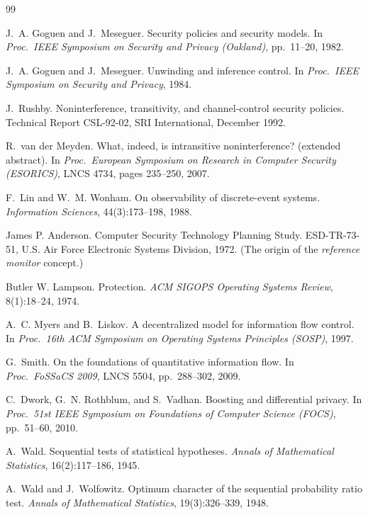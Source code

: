 \documentclass[11pt,a4paper]{article}
\theoremstyle{definition}
\begin{document}
\begin{thebibliography}{99}

 J.~A. Goguen and J.~Meseguer. Security policies and security models. In
\emph{Proc.\ IEEE Symposium on Security and Privacy (Oakland)}, pp.~11--20, 1982.

 J.~A. Goguen and J.~Meseguer. Unwinding and inference control. In
\emph{Proc.\ IEEE Symposium on Security and Privacy}, 1984.

 J.~Rushby. Noninterference, transitivity, and channel-control security policies.
Technical Report CSL-92-02, SRI International, December 1992.

 R.~van der Meyden. What, indeed, is intransitive noninterference? (extended abstract). In
\emph{Proc.\ European Symposium on Research in Computer Security (ESORICS)}, LNCS 4734, pages 235--250, 2007.

 F.~Lin and W.~M. Wonham. On observability of discrete-event systems.
\emph{Information Sciences}, 44(3):173--198, 1988.

 James P. Anderson. Computer Security Technology Planning Study.
ESD-TR-73-51, U.S. Air Force Electronic Systems Division, 1972. (The origin of the
\emph{reference monitor} concept.)

 Butler W. Lampson. Protection. \emph{ACM SIGOPS Operating Systems
Review}, 8(1):18--24, 1974.

 A.~C. Myers and B.~Liskov. A decentralized model for information flow
control. In \emph{Proc.\ 16th ACM Symposium on Operating Systems Principles (SOSP)}, 1997.

 G.~Smith. On the foundations of quantitative information flow. In \emph{Proc.\
FoSSaCS 2009}, LNCS 5504, pp.~288--302, 2009.

 C.~Dwork, G.~N. Rothblum, and S.~Vadhan. Boosting and differential privacy. In
\emph{Proc.\ 51st IEEE Symposium on Foundations of Computer Science (FOCS)}, pp.~51--60, 2010.

 A.~Wald. Sequential tests of statistical hypotheses. \emph{Annals of Mathematical
Statistics}, 16(2):117--186, 1945.

 A.~Wald and J.~Wolfowitz. Optimum character of the sequential probability
ratio test. \emph{Annals of Mathematical Statistics}, 19(3):326--339, 1948.


\end{thebibliography}
\end{document}
